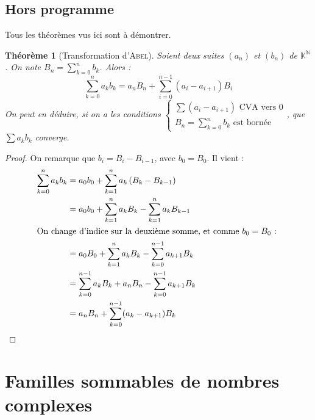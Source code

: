 \documentclass[11pt,a4paper]{report}
\newtheorem{itheorem}[theorem]{Théorème}
\theoremstyle{definition}
\begin{document}
\section{Hors programme} %
\label{sec:hors_programme}
Tous les théorèmes vus ici sont à démontrer.
\begin{itheorem}[Transformation d'\textsc{Abel}]
    Soient deux suites $(a_n)$ et $(b_n)$ de $\mathbb{K}^\mathbb{N}$. On note $B_n = \sum_{k=0}^n b_k$. Alors :
    \begin{equation}
    \sum_{k=0}^n a_k b_k = a_n B_n + \sum_{i=0}^{n-1} (a_i - a_{i+1}) B_i
    \end{equation}
    On peut en déduire, si on a les conditions $\left\lbrace \begin{array}{l}
        \sum (a_i - a_{i+1}) \text{ CVA vers }0 \\
        B_n = \sum_{k=0}^n b_k \text{ est bornée}
    \end{array}\right.$, que $\sum a_k b_k$ converge.
\end{itheorem}
\begin{proof}
    On remarque que $b_i = B_{i} - B_{i-1}$, avec $b_0 = B_0$. Il vient : 
    \begin{align*}
        \sum_{k=0}^n a_k b_k    &= a_0 b_0 + \sum_{k=1}^n a_k \left( B_k - B_{k-1} \right) \\
                                &= a_0 b_0 + \sum_{k=1}^n a_k B_k - \sum_{k=1}^n a_k B_{k-1} \\
                                \intertext{On change d'indice sur la deuxième somme, et comme $b_0 = B_0$ : }
                                &=  a_0 B_0 + \sum_{k=1}^n a_k B_k - \sum_{k=0}^{n-1} a_{k+1} B_k \\
                                &= \sum_{k=0}^{n-1} a_k B_k + a_n B_n - \sum_{k=0}^{n-1} a_{k+1} B_k \\
                                &= a_n B_n + \sum_{k=0}^{n-1} (a_{k} - a_{k+1}) B_k
    \end{align*}
\end{proof}


\chapter{Familles sommables de nombres complexes} %
\label{cha:familles_sommables_de_nombres_complexes}
\end{document}
